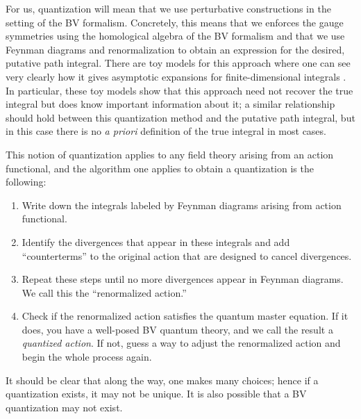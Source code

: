 For us, quantization will mean that we use perturbative constructions in the setting of the BV formalism.
Concretely, this means that we enforces the gauge symmetries using the homological algebra of the BV formalism 
and that we use Feynman diagrams and renormalization to obtain an expression for the desired, putative path integral. 
There are toy models for this approach where one can see very clearly how it gives asymptotic expansions for finite-dimensional integrals .
In particular, these toy models show that this approach need not recover the true integral
but does know important information about it;
a similar relationship should hold between this quantization method and the putative path integral, 
but in this case there is no {\em a priori} definition of the true integral in most cases.

This notion of quantization applies to any field theory arising from an action functional,
and the algorithm one applies to obtain a quantization is the following:
\begin{enumerate}
\item Write down the integrals labeled by Feynman diagrams arising from action functional.
\item Identify the divergences that appear in these integrals and add ``counterterms'' to the original action that are designed to cancel divergences.
\item Repeat these steps until no more divergences appear in Feynman diagrams.
We call this the ``renormalized action.''
\item Check if the renormalized action satisfies the quantum master equation. 
If it does, you have a well-posed BV quantum theory, and we call the result a {\em quantized action}. If not, guess a way to adjust the renormalized action and begin the whole process again.
\end{enumerate}
It should be clear that along the way, one makes many choices;
hence if a quantization exists, it may not be unique.
It is also possible that a BV quantization may not exist.
